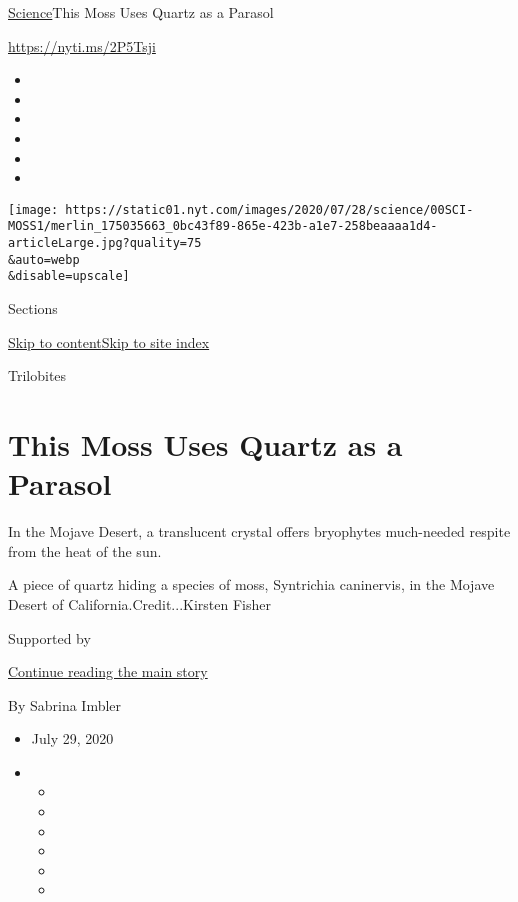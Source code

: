 \href{/section/science}{Science}\textbar{}This Moss Uses Quartz as a
Parasol

\url{https://nyti.ms/2P5Tsji}

\begin{itemize}
\item
\item
\item
\item
\item
\item
\end{itemize}

\texttt{[image: https://static01.nyt.com/images/2020/07/28/science/00SCI-MOSS1/merlin\_175035663\_0bc43f89-865e-423b-a1e7-258beaaaa1d4-articleLarge.jpg?quality=75\\\&auto=webp\\\&disable=upscale]}

Sections

\protect\hyperlink{site-content}{Skip to
content}\protect\hyperlink{site-index}{Skip to site index}

Trilobites

\hypertarget{this-moss-uses-quartz-as-a-parasol}{%
\section{This Moss Uses Quartz as a
Parasol}\label{this-moss-uses-quartz-as-a-parasol}}

In the Mojave Desert, a translucent crystal offers bryophytes
much-needed respite from the heat of the sun.

A piece of quartz hiding a species of moss, Syntrichia caninervis, in
the Mojave Desert of California.Credit...Kirsten Fisher

Supported by

\protect\hyperlink{after-sponsor}{Continue reading the main story}

By Sabrina Imbler

\begin{itemize}
\item
  July 29, 2020
\item
  \begin{itemize}
  \item
  \item
  \item
  \item
  \item
  \item
  \end{itemize}
\end{itemize}

